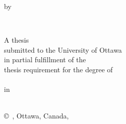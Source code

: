 \begin{titlepage}
        \begin{center}
        \vspace*{1.0cm}

        \Huge
        {\bf \thesistitlecoverpage}

        \vspace*{1.0cm}

        \normalsize
        by \\

        \vspace*{1.0cm}

        \Large
        \thesisauthor \\

        \vspace*{3.0cm}

        \normalsize
        A thesis \\
        submitted to the University of Ottawa \\ 
        in partial fulfillment of the \\
        thesis requirement for the degree of \\
        \thesisdegree \\
        in \\
        \nameofprogram \\

        \vspace*{3.0cm}


        \copyright\ {\thesisauthor}, Ottawa, Canada, \graduationyear \\
        \end{center}
\end{titlepage}

